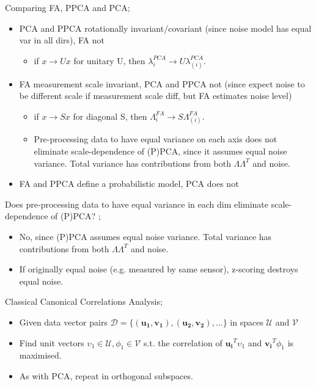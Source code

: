 \documentclass{article}
\begin{document}
Comparing FA, PPCA and PCA; \begin{itemize} \item PCA and PPCA rotationally invariant/covariant (since noise model has equal var in all dirs), FA not \begin{itemize} \item if $x\rightarrow Ux$ for unitary U, then $\lambda^{PCA}_{i}\rightarrow U \lambda^{PCA}_{(i)}$.  \end{itemize} \item FA measurement scale invariant, PCA and PPCA not (since expect noise to be different scale if measurement scale diff, but FA estimates noise level) \begin{itemize} \item if $x\rightarrow Sx$ for diagonal S, then $\Lambda^{FA}_{i}\rightarrow S \Lambda^{FA}_{(i)}$.  \item Pre-processing data to have equal variance on each axis does not eliminate scale-dependence of (P)PCA, since it assumes equal noise variance. Total variance has contributions from both $\Lambda\Lambda^T$ and noise.  \end{itemize} \item FA and PPCA define a probabilistic model, PCA does not \end{itemize}

Does pre-processing data to have equal variance in each dim eliminate scale-dependence of (P)PCA? ;\begin{itemize} \item No, since (P)PCA assumes equal noise variance. Total variance has contributions from both $\Lambda\Lambda^T$ and noise.  \item If originally equal noise (e.g. measured by same sensor), z-scoring destroys equal noise.  \end{itemize}

Classical Canonical Correlations Analysis; \begin{itemize} \item Given data vector pairs $\mathcal{D}=\{(\mathbf{u_1, v_1}), \mathbf{(u_2, v_2)},...\}$ in spaces $\mathcal{U}$ and $\mathcal{V}$ \item Find unit vectors $\upsilon_1\in\mathcal{U}, \phi_1\in\mathcal{V}$ s.t. the correlation of $\mathbf{u_i}^T\upsilon_1$ and $\mathbf{v_i}^T\phi_1$ is maximised.  \item As with PCA, repeat in orthogonal subspaces.  \end{itemize}
\end{document}
